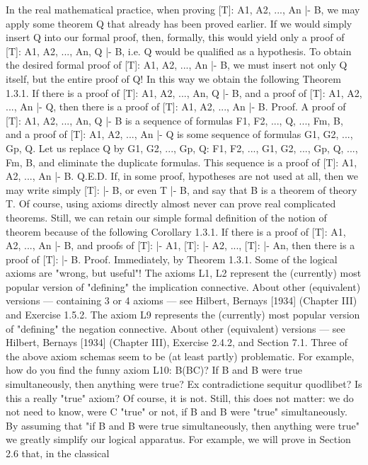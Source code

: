 In the real mathematical practice, when proving [T]: A1, A2, ..., An |- B, we may apply some theorem Q
that already has been proved earlier. If we would simply insert Q into our formal proof, then, formally,
this would yield only a proof of [T]: A1, A2, ..., An, Q |- B, i.e. Q would be qualified as a hypothesis. To
obtain the desired formal proof of [T]: A1, A2, ..., An |- B, we must insert not only Q itself, but the entire
proof of Q! In this way we obtain the following
Theorem 1.3.1. If there is a proof of [T]: A1, A2, ..., An, Q |- B, and a proof of [T]: A1, A2, ..., An |- Q,
then there is a proof of [T]: A1, A2, ..., An |- B.
Proof. A proof of [T]: A1, A2, ..., An, Q |- B is a sequence of formulas F1, F2, ..., Q, ..., Fm, B, and a proof
of [T]: A1, A2, ..., An |- Q is some sequence of formulas G1, G2, ..., Gp, Q. Let us replace Q by G1, G2, ...,
Gp, Q:
F1, F2, ..., G1, G2, ..., Gp, Q, ..., Fm, B,
and eliminate the duplicate formulas. This sequence is a proof of [T]: A1, A2, ..., An |- B. Q.E.D.
If, in some proof, hypotheses are not used at all, then we may write simply [T]: |- B, or even T |- B, and
say that B is a theorem of theory T. Of course, using axioms directly almost never can prove real
complicated theorems. Still, we can retain our simple formal definition of the notion of theorem because
of the following
Corollary 1.3.1. If there is a proof of [T]: A1, A2, ..., An |- B, and proofs of [T]: |- A1, [T]: |- A2, ..., [T]: |-
An, then there is a proof of [T]: |- B.
Proof. Immediately, by Theorem 1.3.1.
Some of the logical axioms are "wrong, but useful"!
The axioms L1, L2 represent the (currently) most popular version of "defining" the implication
connective. About other (equivalent) versions --- containing 3 or 4 axioms --- see Hilbert, Bernays [1934]
(Chapter III) and Exercise 1.5.2.
The axiom L9 represents the (currently) most popular version of "defining" the negation connective.
About other (equivalent) versions --- see Hilbert, Bernays [1934] (Chapter III), Exercise 2.4.2, and Section
7.1.
Three of the above axiom schemas seem to be (at least partly) problematic.
For example, how do you find the funny axiom L10: \neg B\IMPLIES (B\IMPLIES C)? If \neg B and B were true simultaneously,
then anything were true? Ex contradictione sequitur quodlibet? Is this a really "true" axiom? Of course, it
is not. Still, this does not matter: we do not need to know, were C "true" or not, if \neg B and B were "true"
simultaneously. By assuming that "if \neg B and B were true simultaneously, then anything were true" we
greatly simplify our logical apparatus. For example, we will prove in Section 2.6 that, in the classical
